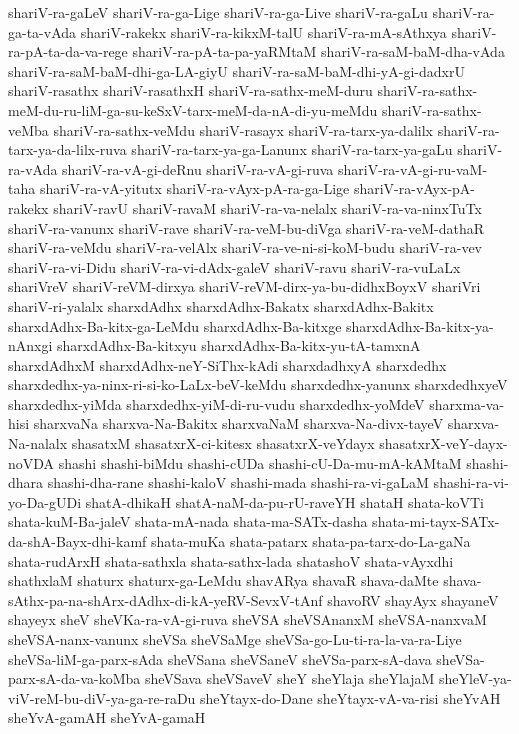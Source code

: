 {shariV-ra-gaLeV
shariV-ra-ga-Lige
shariV-ra-ga-Live
shariV-ra-gaLu
shariV-ra-ga-ta-vAda
shariV-rakekx
shariV-ra-kikxM-talU
shariV-ra-mA-sAthxya
shariV-ra-pA-ta-da-va-rege
shariV-ra-pA-ta-pa-yaRMtaM
shariV-ra-saM-baM-dha-vAda
shariV-ra-saM-baM-dhi-ga-LA-giyU
shariV-ra-saM-baM-dhi-yA-gi-dadxrU
shariV-rasathx
shariV-rasathxH
shariV-ra-sathx-meM-duru
shariV-ra-sathx-meM-du-ru-liM-ga-su-keSxV-tarx-meM-da-nA-di-yu-meMdu
shariV-ra-sathx-veMba
shariV-ra-sathx-veMdu
shariV-rasayx
shariV-ra-tarx-ya-dalilx
shariV-ra-tarx-ya-da-lilx-ruva
shariV-ra-tarx-ya-ga-Lanunx
shariV-ra-tarx-ya-gaLu
shariV-ra-vAda
shariV-ra-vA-gi-deRnu
shariV-ra-vA-gi-ruva
shariV-ra-vA-gi-ru-vaM-taha
shariV-ra-vA-yitutx
shariV-ra-vAyx-pA-ra-ga-Lige
shariV-ra-vAyx-pA-rakekx
shariV-ravU
shariV-ravaM
shariV-ra-va-nelalx
shariV-ra-va-ninxTuTx
shariV-ra-vanunx
shariV-rave
shariV-ra-veM-bu-diVga
shariV-ra-veM-dathaR
shariV-ra-veMdu
shariV-ra-velAlx
shariV-ra-ve-ni-si-koM-budu
shariV-ra-vev
shariV-ra-vi-Didu
shariV-ra-vi-dAdx-galeV
shariV-ravu
shariV-ra-vuLaLx
shariVreV
shariV-reVM-dirxya
shariV-reVM-dirx-ya-bu-didhxBoyxV
shariVri
shariV-ri-yalalx
sharxdAdhx
sharxdAdhx-Bakatx
sharxdAdhx-Bakitx
sharxdAdhx-Ba-kitx-ga-LeMdu
sharxdAdhx-Ba-kitxge
sharxdAdhx-Ba-kitx-ya-nAnxgi
sharxdAdhx-Ba-kitxyu
sharxdAdhx-Ba-kitx-yu-tA-tamxnA
sharxdAdhxM
sharxdAdhx-neY-SiThx-kAdi
sharxdadhxyA
sharxdedhx
sharxdedhx-ya-ninx-ri-si-ko-LaLx-beV-keMdu
sharxdedhx-yanunx
sharxdedhxyeV
sharxdedhx-yiMda
sharxdedhx-yiM-di-ru-vudu
sharxdedhx-yoMdeV
sharxma-va-hisi
sharxvaNa
sharxva-Na-Bakitx
sharxvaNaM
sharxva-Na-divx-tayeV
sharxva-Na-nalalx
shasatxM
shasatxrX-ci-kitesx
shasatxrX-veYdayx
shasatxrX-veY-dayx-noVDA
shashi
shashi-biMdu
shashi-cUDa
shashi-cU-Da-mu-mA-kAMtaM
shashi-dhara
shashi-dha-rane
shashi-kaloV
shashi-mada
shashi-ra-vi-gaLaM
shashi-ra-vi-yo-Da-gUDi
shatA-dhikaH
shatA-naM-da-pu-rU-raveYH
shataH
shata-koVTi
shata-kuM-Ba-jaleV
shata-mA-nada
shata-ma-SATx-dasha
shata-mi-tayx-SATx-da-shA-Bayx-dhi-kamf
shata-muKa
shata-patarx
shata-pa-tarx-do-La-gaNa
shata-rudArxH
shata-sathxla
shata-sathx-lada
shatashoV
shata-vAyxdhi
shathxlaM
shaturx
shaturx-ga-LeMdu
shavARya
shavaR
shava-daMte
shava-sAthx-pa-na-shArx-dAdhx-di-kA-yeRV-SevxV-tAnf
shavoRV
shayAyx
shayaneV
shayeyx
sheV
sheVKa-ra-vA-gi-ruva
sheVSA
sheVSAnanxM
sheVSA-nanxvaM
sheVSA-nanx-vanunx
sheVSa
sheVSaMge
sheVSa-go-Lu-ti-ra-la-va-ra-Liye
sheVSa-liM-ga-parx-sAda
sheVSana
sheVSaneV
sheVSa-parx-sA-dava
sheVSa-parx-sA-da-va-koMba
sheVSava
sheVSaveV
sheY
sheYlaja
sheYlajaM
sheYleV-ya-viV-reM-bu-diV-ya-ga-re-raDu
sheYtayx-do-Dane
sheYtayx-vA-va-risi
sheYvAH
sheYvA-gamAH
sheYvA-gamaH
}
